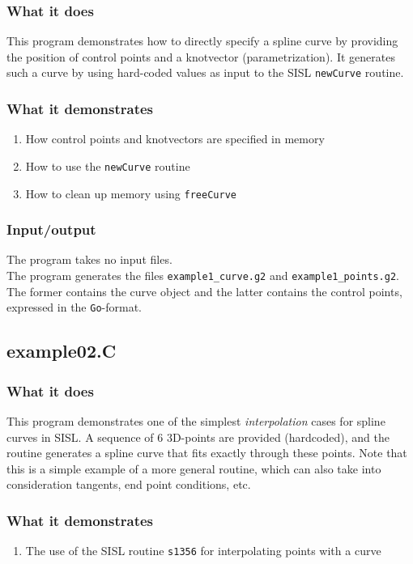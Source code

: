 \subsubsection{What it does}
This program demonstrates how to directly specify a spline curve by providing the 
position of control points and a knotvector (parametrization).  It generates such
a curve by using hard-coded values as input to the SISL  \verb/newCurve/ routine.
\subsubsection{What it demonstrates}
\begin{enumerate}
\item How control points and knotvectors are specified in memory
\item How to use the \verb/newCurve/ routine
\item How to clean up memory using \verb/freeCurve/
\end{enumerate}

\subsubsection{Input/output}
The program takes no input files.\\
The program generates the files \verb/example1_curve.g2/ and \verb/example1_points.g2/.
The former contains the curve object and the latter contains the control points, expressed
in the \verb/Go/-format.

\subsection{example02.C}

\subsubsection{What it does}
This program demonstrates one of the simplest \emph{interpolation} cases for spline 
curves in SISL.  A sequence of 6 3D-points are provided (hardcoded), and the routine
generates a spline curve that fits exactly through these points.  Note that this is a
simple example of a more general routine, which can also take into consideration
tangents, end point conditions, etc.

\subsubsection{What it demonstrates}
\begin{enumerate}
\item The use of the SISL routine \verb/s1356/ for interpolating points with a curve
\end{enumerate}
